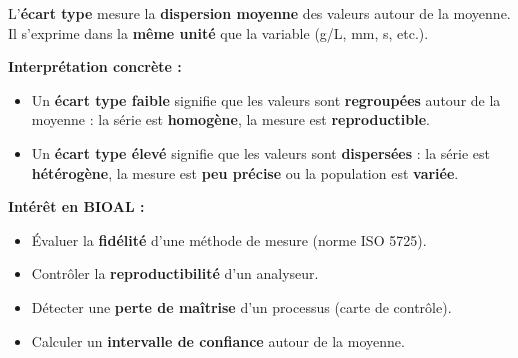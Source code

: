 \documentclass[11pt,a4paper]{article}
\begin{document}
\begin{interpretation}
L'\textbf{écart type} mesure la \textbf{dispersion moyenne} des valeurs autour de la moyenne. Il s'exprime dans la \textbf{même unité} que la variable (g/L, mm, s, etc.).

\vspace{0.2cm}
\textbf{Interprétation concrète :}
\begin{itemize}[leftmargin=*]
  \item Un \textbf{écart type faible} signifie que les valeurs sont \textbf{regroupées} autour de la moyenne : la série est \textbf{homogène}, la mesure est \textbf{reproductible}.
  \item Un \textbf{écart type élevé} signifie que les valeurs sont \textbf{dispersées} : la série est \textbf{hétérogène}, la mesure est \textbf{peu précise} ou la population est \textbf{variée}.
\end{itemize}

\vspace{0.2cm}
\textbf{Intérêt en BIOAL :}
\begin{itemize}[leftmargin=*]
  \item Évaluer la \textbf{fidélité} d'une méthode de mesure (norme ISO 5725).
  \item Contrôler la \textbf{reproductibilité} d'un analyseur.
  \item Détecter une \textbf{perte de maîtrise} d'un processus (carte de contrôle).
  \item Calculer un \textbf{intervalle de confiance} autour de la moyenne.
\end{itemize}
\end{interpretation}
\end{document}
